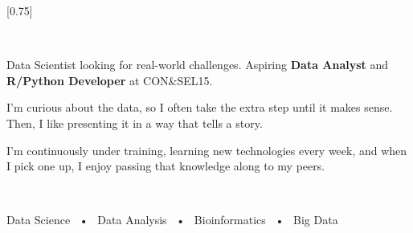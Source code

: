 \documentclass[lighthipster]{simplehipstercv}
\begin{document}
\setlength{\columnsep}{1.5cm}
[0.75]
\begin{paracol}{2}

\paracolbackgroundoptions


\footnotesize
{\setasidefontcolour
\flushright
\begin{center}
\end{center}

\vspace{1em}


\vspace{1em}

\vspace{2em}

\\[0.5em]
\vspace{0.5em}

Data Scientist looking for real-world challenges. Aspiring \textbf{Data Analyst} and \textbf{R/Python Developer} at CON\&SEL15. 
\vspace{2em}

I'm curious about the data, so I often take the extra step until it makes sense. Then, I like presenting it in a way that tells a story. 
\vspace{2em}

I'm continuously under training, learning new technologies every week, and when I pick one up, I enjoy passing that knowledge along to my peers. 



\bigskip



\bigskip

 \\[0.5em]
\vspace{0.5em}

Data Science ~•~ Data Analysis ~•~ Bioinformatics ~•~ Big Data

\bigskip

\bigskip

}
\end{paracol}
\end{document}
